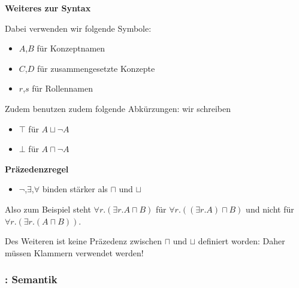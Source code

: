 \textbf{Weiteres zur Syntax}

Dabei verwenden wir folgende Symbole:

\begin{itemize}
  \item $A$,$B$ für Konzeptnamen
  \item $C$,$D$ für zusammengesetzte Konzepte
  \item $r$,$s$ für Rollennamen
\end{itemize}

Zudem benutzen zudem folgende Abkürzungen: wir schreiben

\begin{itemize}
  \item $\top$ für $A \sqcup \neg A$
  \item $\bot$ für $A \sqcap \neg A$
\end{itemize}

\textbf{Präzedenzregel}

\begin{itemize}
  \item{$\neg$,$\exists$,$\forall$ binden stärker als $\sqcap$ und $\sqcup$}
\end{itemize}

Also zum Beispiel steht $\forall r.(\exists r.A \sqcap B)$ für $\forall r.((\exists r.A) \sqcap B)$ und nicht für $\forall r.(\exists r.(A \sqcap B))$.

Des Weiteren ist keine Präzedenz zwischen $\sqcap$ und $\sqcup$ definiert worden: Daher müssen Klammern verwendet werden!

\subsubsection{\texorpdfstring{\ALC}{ALC}: Semantik}

